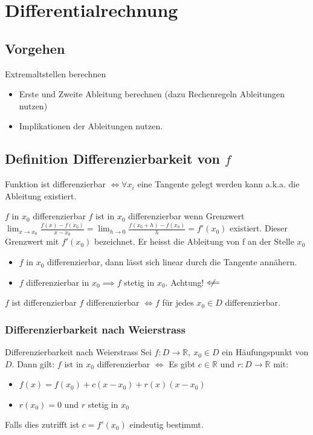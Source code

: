 \documentclass[a4paper]{article}
\newcommand\notimpliedby{\centernot\impliedby}
\begin{document}
\section{Differentialrechnung}
\subsection{Vorgehen}
\begin{howtobox}{Extremaltstellen berechnen}
  \begin{itemize}[leftmargin=3mm, topsep=1pt, parsep=1pt]
    \item[1.] Erste und Zweite Ableitung berechnen (dazu Rechenregeln Ableitungen nutzen) 
    \item[2.] Implikationen der Ableitungen nutzen.
  \end{itemize}
\end{howtobox}


\subsection{Definition Differenzierbarkeit von $f$}
Funktion ist differenzierbar $\iff \forall x_i$ eine Tangente gelegt werden kann a.k.a. die Ableitung existiert.
\begin{mainbox}{$f$ in $x_0$ differenzierbar}
  $f$ ist in $x_0$ differenzierbar wenn Grenzwert $\lim_{x\to x_0} \frac{f(x) - f(x_0)}{x - x_0} = \lim_{h\to0}\frac{f(x_0+h)-f(x_0)}{h} = f'(x_0)$ existiert. 
  Dieser Grenzwert mit $f'(x_0)$ bezeichnet. Er heisst die Ableitung von f an der Stelle $x_0$\\ 
\end{mainbox}
\begin{itemize}[leftmargin=4.5mm, topsep=1pt, parsep=1pt]
  \item $f$ in $x_0$ differenzierbar, dann lässt sich linear durch die Tangente annähern.
  \item $f$ diﬀerenzierbar in $x_0 \implies f$ stetig in $x_0$. Achtung!$\notimpliedby$
\end{itemize}

\begin{mainbox}{$f$ ist differenzierbar}
  $f$ differenzierbar $\iff f$ für jedes $x_0 \in D$ differenzierbar. 
\end{mainbox}

\subsubsection{Differenzierbarkeit nach Weierstrass}
\begin{subbox}{Differenzierbarkeit nach Weierstrass}
  Sei $f:D \rightarrow \mathbb{R}, \ x_0 \in D$ ein Häufungspunkt von $D$. Dann gilt: $f$ ist in $x_0$ differenzierbar $\Leftrightarrow$ Es gibt $c \in \mathbb{R}$ und $r:D \rightarrow \mathbb{R}$ mit:
  \begin{itemize}[leftmargin=4.5mm, topsep=1pt, parsep=1pt]
    \item[1.] $f(x) = f(x_0) + c(x-x_0) + r(x)(x-x_0)$
    \item[2.] $r(x_0) = 0$ und $r$ stetig in $x_0$
  \end{itemize}
  Falls dies zutrifft ist $c = f'(x_0)$ eindeutig bestimmt.
\end{subbox}
\end{document}
